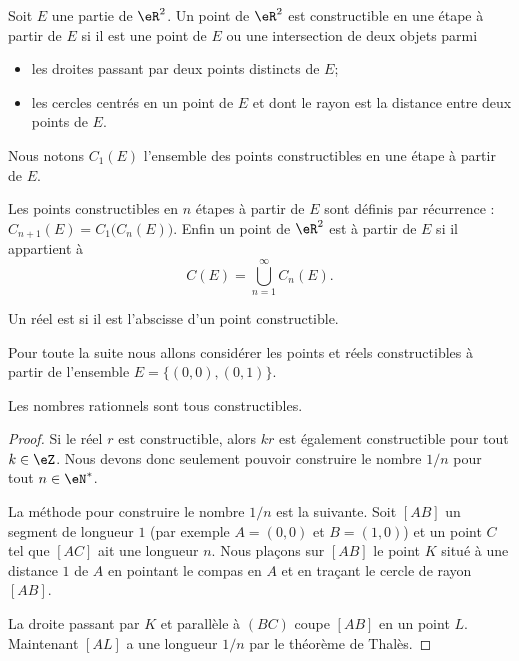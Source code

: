 \begin{definition}
    Soit \( E\) une partie de \( \eR^2\). Un point de \( \eR^2\) est constructible en une étape à partir de \( E\) si il est une point de \( E\) ou une intersection de deux objets parmi
    \begin{itemize}
        \item les droites passant par deux points distincts de \( E\);
        \item les cercles centrés en un point de \( E\) et dont le rayon est la distance entre deux points de \( E\).
    \end{itemize}
    Nous notons \( C_1(E)\) l'ensemble des points constructibles en une étape à partir de \( E\).

    Les points constructibles en \( n\) étapes à partir de \( E\) sont définis par récurrence : \( C_{n+1}(E)=C_1\big( C_n(E) \big)\). Enfin un point de \( \eR^2\) est  à partir de \( E\) si il appartient à
    \begin{equation}
        C(E)=\bigcup_{n=1}^{\infty}C_n(E).
    \end{equation}
    
    Un réel est  si il est l'abscisse d'un point constructible.
\end{definition}
Pour toute la suite nous allons considérer les points et réels constructibles à partir de l'ensemble \( E=\{ (0,0),(0,1) \}\).

\begin{proposition}
    Les nombres rationnels sont tous constructibles.
\end{proposition}

\begin{proof}
    Si le réel \( r\) est constructible, alors \( kr\) est également constructible pour tout \( k\in \eZ\). Nous devons donc seulement pouvoir construire le nombre \( 1/n\) pour tout \( n\in \eN^*\).


    \begin{center}
   
    \end{center}

    La méthode pour construire le nombre \( 1/n\) est la suivante. Soit \( [AB]\) un segment de longueur \( 1\) (par exemple \( A=(0,0)\) et \( B=(1,0)\)) et un point \( C\) tel que \( [AC]\) ait une longueur \( n\). Nous plaçons sur \( [AB]\) le point \( K\) situé à une distance \( 1\) de \( A\) en pointant le compas en \( A\) et en traçant le cercle de rayon \( [AB]\).

    La droite passant par \( K\) et parallèle à \( (BC)\) coupe \( [AB]\) en un point \( L\). Maintenant \( [AL]\) a une longueur \( 1/n\) par le théorème de Thalès.

\end{proof}

